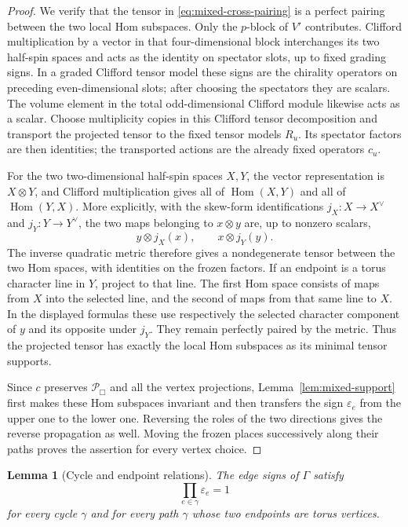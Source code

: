 \documentclass[11pt]{article}
\numberwithin{equation}{section}
\newtheorem{lemma}[theorem]{Lemma}
\theoremstyle{definition}
\theoremstyle{remark}
\DeclareMathOperator{\Hom}{Hom}
\begin{document}
\begin{proof}
We verify that the tensor in \eqref{eq:mixed-cross-pairing} is a
perfect pairing between the two local Hom subspaces.  Only the
$p$-block of $V'$ contributes.  Clifford multiplication by a vector
in that four-dimensional block interchanges its two half-spin
spaces and acts as the identity on spectator slots, up to fixed
grading signs.  In a graded Clifford tensor model these signs are
the chirality operators on preceding even-dimensional slots; after
choosing the spectators they are scalars.  The volume element in
the total odd-dimensional Clifford module likewise acts as a
scalar.  Choose multiplicity copies in this Clifford tensor
decomposition and transport the projected tensor to the fixed
tensor models $R_u$.  Its spectator factors are then identities;
the transported actions are the already fixed operators $c_u$.

For the two two-dimensional half-spin spaces $X,Y$, the vector
representation is $X\otimes Y$, and Clifford multiplication gives
all of $\Hom(X,Y)$ and all of $\Hom(Y,X)$.  More explicitly, with
the skew-form identifications $j_X:X\to X^\vee$ and
$j_Y:Y\to Y^\vee$, the two maps belonging to $x\otimes y$ are,
up to nonzero scalars,
\[
 y\otimes j_X(x),\qquad x\otimes j_Y(y).
\]
The inverse quadratic metric therefore gives a nondegenerate tensor
between the two Hom spaces, with identities on the frozen factors.
If an endpoint is a torus character line in $Y$, project to that
line.  The first Hom space consists of maps from $X$ into the selected
line, and the second of maps from that same line to $X$.  In the
displayed formulas these use respectively the selected character
component of $y$ and its opposite under $j_Y$.  They remain perfectly
paired by the metric.  Thus the projected tensor has
exactly the local Hom subspaces as its minimal tensor supports.

Since $c$ preserves $\mathcal P_{\Box}$ and all the vertex
projections, Lemma~\ref{lem:mixed-support} first makes these Hom
subspaces invariant and then transfers the sign $\varepsilon_e$
from the upper one to the lower one.  Reversing the roles of the
two directions gives the reverse propagation as well.  Moving the
frozen places successively along their paths proves the assertion
for every vertex choice.
\end{proof}

\begin{lemma}[Cycle and endpoint relations]\label{lem:mixed-cycle}
The edge signs of $\Gamma$ satisfy
\begin{equation}\label{eq:mixed-cycle-signs}
 \prod_{e\in\gamma}\varepsilon_e=1
\end{equation}
for every cycle $\gamma$ and for every path $\gamma$ whose two
endpoints are torus vertices.
\end{lemma}
\end{document}
